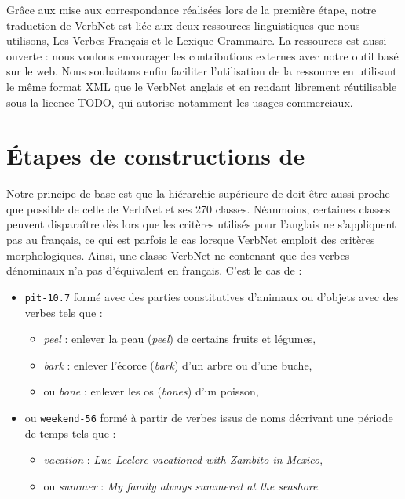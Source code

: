 Grâce aux mise aux correspondance réalisées lors de la première étape, notre
traduction de VerbNet est liée aux deux ressources linguistiques que nous
utilisons, Les Verbes Français et le Lexique-Grammaire. La ressources est aussi
ouverte : nous voulons encourager les contributions externes avec notre outil
basé sur le web. Nous souhaitons enfin faciliter l'utilisation de la ressource
en utilisant le même format XML que le VerbNet anglais et en rendant
\verbenet{} librement réutilisable sous la licence TODO, qui autorise notamment
les usages commerciaux.

\section{Étapes de constructions de \verbenet{}}

Notre principe de base est que la hiérarchie supérieure de \verbenet{} doit
être aussi proche que possible de celle de VerbNet et ses 270 classes.
Néanmoins, certaines classes peuvent disparaître dès lors que les critères
utilisés pour l'anglais ne s'appliquent pas au français, ce qui est parfois le
cas lorsque VerbNet emploit des critères morphologiques. Ainsi, une classe
VerbNet ne contenant que des verbes dénominaux n'a pas d'équivalent en
français. C'est le cas de :

\begin{itemize}
    \item {\color{blue}\texttt{pit-10.7}} formé avec des parties constitutives
        d'animaux ou d'objets avec des verbes tels que :
        \begin{itemize}
            \item \textit{peel} : enlever la peau (\textit{peel}) de certains fruits
                et légumes,
            \item \textit{bark} : enlever l'écorce (\textit{bark}) d'un arbre ou
                d'une buche,
            \item ou \textit{bone} : enlever les os (\textit{bones}) d'un poisson,
        \end{itemize}
    \item ou {\color{blue}\texttt{weekend-56}} formé à partir de verbes issus
        de noms décrivant une période de temps tels que :
        \begin{itemize}
            \item \textit{vacation} : \textit{Luc Leclerc vacationed with Zambito in
                Mexico},
            \item ou \textit{summer} : \textit{My family always summered at the seashore}.
        \end{itemize}
\end{itemize}

